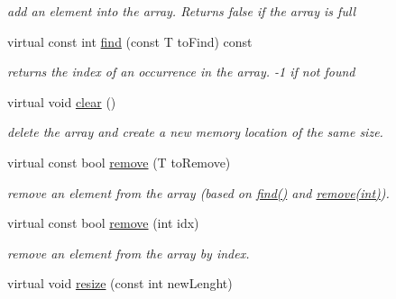 \begin{DoxyCompactItemize}
\begin{DoxyCompactList}\small\item\em add an element into the array. Returns false if the array is full \end{DoxyCompactList}\item 
\hypertarget{classplist_1_1PointerArray_ae5f25ecad0959d757c2efc6c56379e02}{virtual const int \hyperlink{classplist_1_1PointerArray_ae5f25ecad0959d757c2efc6c56379e02}{find} (const T to\-Find) const }\label{classplist_1_1PointerArray_ae5f25ecad0959d757c2efc6c56379e02}

\begin{DoxyCompactList}\small\item\em returns the index of an occurrence in the array. -\/1 if not found \end{DoxyCompactList}\item 
\hypertarget{classplist_1_1PointerArray_a027decd9e3e3b168c5be1c01bce7b2ae}{virtual void \hyperlink{classplist_1_1PointerArray_a027decd9e3e3b168c5be1c01bce7b2ae}{clear} ()}\label{classplist_1_1PointerArray_a027decd9e3e3b168c5be1c01bce7b2ae}

\begin{DoxyCompactList}\small\item\em delete the array and create a new memory location of the same size. \end{DoxyCompactList}\item 
\hypertarget{classplist_1_1PointerArray_ae2f7e7da1f303ec20f91c173c2f09330}{virtual const bool \hyperlink{classplist_1_1PointerArray_ae2f7e7da1f303ec20f91c173c2f09330}{remove} (T to\-Remove)}\label{classplist_1_1PointerArray_ae2f7e7da1f303ec20f91c173c2f09330}

\begin{DoxyCompactList}\small\item\em remove an element from the array (based on \hyperlink{classplist_1_1PointerArray_ae5f25ecad0959d757c2efc6c56379e02}{find()} and \hyperlink{classplist_1_1PointerArray_a73c3e280cea29562caab724eda97071c}{remove(int)}). \end{DoxyCompactList}\item 
\hypertarget{classplist_1_1PointerArray_a73c3e280cea29562caab724eda97071c}{virtual const bool \hyperlink{classplist_1_1PointerArray_a73c3e280cea29562caab724eda97071c}{remove} (int idx)}\label{classplist_1_1PointerArray_a73c3e280cea29562caab724eda97071c}

\begin{DoxyCompactList}\small\item\em remove an element from the array by index. \end{DoxyCompactList}\item 
\hypertarget{classplist_1_1PointerArray_a029b375c7e17f2c08e8d6a3ee486f8fe}{virtual void \hyperlink{classplist_1_1PointerArray_a029b375c7e17f2c08e8d6a3ee486f8fe}{resize} (const int new\-Lenght)}\label{classplist_1_1PointerArray_a029b375c7e17f2c08e8d6a3ee486f8fe}


\end{DoxyCompactItemize}
